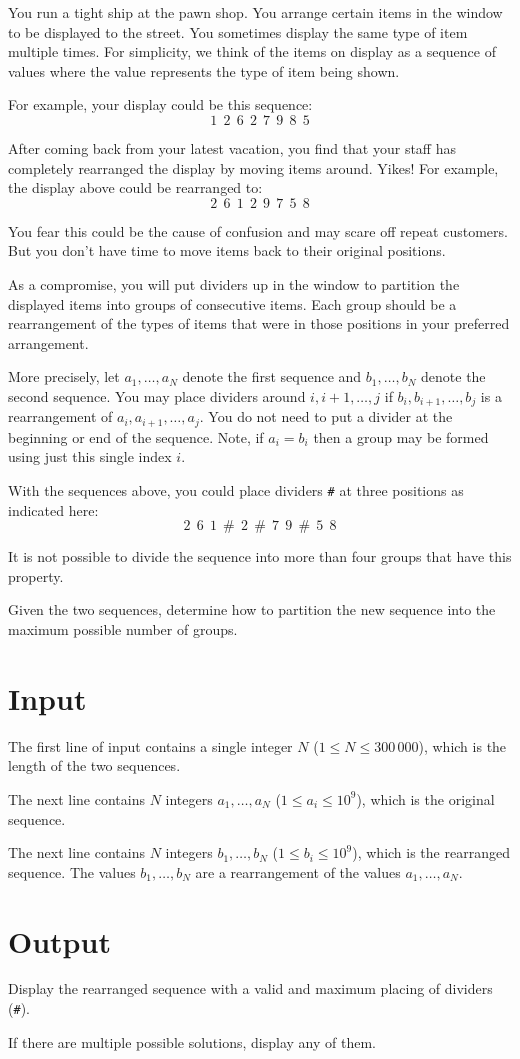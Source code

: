 
You run a tight ship at the pawn shop. You arrange certain items in the window
to be displayed to the street. You sometimes display the same type of item
multiple times. For simplicity, we think of the items on display as
a sequence of values where the value represents the type of item being shown.

For example, your display could be this sequence:
\[ 1~~2~~6~~2~~7~~9~~8~~5 \]

After coming back from your latest vacation, you find that your staff has
completely rearranged the display by moving items around. Yikes! For example,
the display above could be rearranged to:
\[ 2~~6~~1~~2~~9~~7~~5~~8 \]

You fear this could be the cause of confusion and may scare off repeat customers.
But you don't have time to move items back to their original positions.

As a compromise, you will put dividers up in the window to partition the displayed
items into groups of consecutive items. Each group should be a rearrangement of
the types of items that were in those positions in your preferred arrangement.

More precisely, let $a_1, \ldots, a_N$ denote the first sequence and
$b_1, \ldots, b_N$ denote the second sequence. You may place dividers around
$i, i+1, \ldots, j$ if $b_i, b_{i+1}, \ldots, b_j$ is a rearrangement of
$a_i, a_{i+1}, \ldots, a_j$. You do not need to put a divider at the beginning
or end of the sequence. Note, if $a_i = b_i$ then a group may be formed using
just this single index $i$.

With the sequences above, you could place dividers \texttt{\#} at
three positions as indicated here:
\[ 2~~6~~1~~\texttt{\#}~~2~~\texttt{\#}~~7~~9~~\texttt{\#}~~5~~8 \]

It is not possible to divide the sequence into more than four groups
that have this property.

Given the two sequences, determine how to partition the new sequence into
the maximum possible number of groups.

\section*{Input}
The first line of input contains a single integer $N$ ($1 \leq N \leq 300\,000$),
which is the length of the two sequences.

The next line contains $N$ integers $a_1, \ldots, a_N$ ($1 \leq a_i \leq 10^9$),
which is the original sequence.

The next line contains $N$ integers $b_1, \ldots, b_N$ ($1 \leq b_i \leq 10^9$),
which is the rearranged sequence. The values $b_1, \ldots, b_N$ are a
rearrangement of the values $a_1, \ldots, a_N$.

\section*{Output}
Display the rearranged sequence with a valid and maximum placing of dividers (\texttt{\#}).

If there are multiple possible solutions, display any of them.
